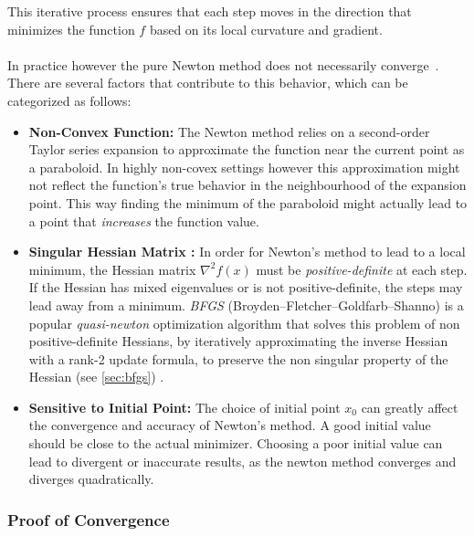 This iterative process ensures that each step moves in the direction that minimizes the function \( f \) based on its local curvature and gradient.\\\\
In practice however the pure Newton method does not necessarily converge~\cite{nocedal2006numerical}. \\
There are several factors that contribute to this behavior, which can be categorized as follows:
\begin{itemize}
    \item \textbf{Non-Convex Function:} The Newton method relies on a second-order Taylor series expansion to approximate the function near the current point as a paraboloid.
     In highly non-covex settings however this approximation might not reflect the function's true behavior in 
    the neighbourhood of the expansion point. This way finding the minimum of the paraboloid might actually lead to a point that \emph{increases} the function value.\cite{kashyap2023survey}
    \item \textbf{Singular Hessian Matrix :} In order for Newton's method to lead to a local minimum,
     the Hessian matrix \( \nabla^2 f(x) \) must be \emph{positive-definite} at each step.
     If the Hessian has mixed eigenvalues or is not positive-definite, the steps may lead away from a minimum.
     \emph{BFGS} (Broyden–Fletcher–Goldfarb–Shanno) is a popular \emph{quasi-newton} optimization algorithm 
     that solves this problem of non positive-definite Hessians, by iteratively approximating the inverse Hessian with a rank-2 update formula,
      to preserve the non singular property of the Hessian (see \ref{sec:bfgs}) .\cite{nocedal2006numerical}
    \item \textbf{Sensitive to Initial Point:} The choice of initial point $x_0$ can greatly affect the convergence and accuracy of Newton's method. A good initial value should be close to the actual minimizer.
     Choosing a poor initial value can lead to divergent or inaccurate results, as the newton method converges and diverges quadratically.\cite{nocedal2006numerical}
   
\end{itemize}

\subsubsection{Proof of Convergence}
\label{sec:newton_conv}


